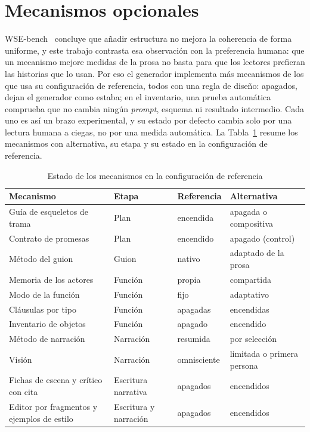 \section{Mecanismos opcionales}\label{sec:opcionales}

WSE-bench~\cite{chen2026b} concluye que añadir estructura no mejora la coherencia de forma uniforme,
y este trabajo contrasta esa observación con la preferencia humana: que un mecanismo mejore medidas
de la prosa no basta para que los
lectores prefieran las historias que lo usan. Por eso el generador implementa más mecanismos de los
que usa su configuración de referencia, todos con una regla de diseño: apagados, dejan el generador
como estaba; en el inventario, una prueba automática comprueba que no cambia ningún
\textit{prompt}, esquema ni resultado intermedio. Cada uno es así un brazo experimental, y su
estado por defecto cambia solo por una lectura humana a ciegas, no por una medida automática. La Tabla~\ref{tab:mecanismos} resume los mecanismos con
alternativa, su etapa y su estado en la configuración de referencia.

\begin{table}[htb]
  \centering
  \caption{Estado de los mecanismos en la configuración de referencia}
  \label{tab:mecanismos}
  \small
  \begin{tabular}{@{}>{\raggedright\arraybackslash}p{5.4cm}>{\raggedright\arraybackslash}p{2.8cm}%
      >{\raggedright\arraybackslash}p{2.0cm}>{\raggedright\arraybackslash}p{3.6cm}@{}}
    \toprule
    Mecanismo & Etapa & Referencia & Alternativa \\
    \midrule
    Guía de esqueletos de trama & Plan & encendida & apagada o compositiva \\
    Contrato de promesas & Plan & encendido & apagado (control) \\
    Método del guion & Guion & nativo & adaptado de la prosa \\
    Memoria de los actores & Función & propia & compartida \\
    Modo de la función & Función & fijo & adaptativo \\
    Cláusulas por tipo & Función & apagadas & encendidas \\
    Inventario de objetos & Función & apagado & encendido \\
    Método de narración & Narración & resumida & por selección \\
    Visión & Narración & omnisciente & limitada o primera persona \\
    Fichas de escena y crítico con cita & Escritura narrativa & apagados & encendidos \\
    Editor por fragmentos y ejemplos de estilo & Escritura y narración & apagados & encendidos \\
    \bottomrule
  \end{tabular}
\end{table}

